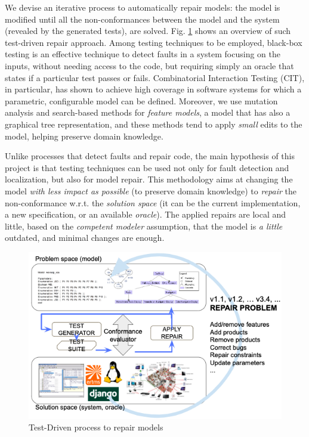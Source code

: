 \documentclass[
11pt, %
oneside, %
english, %
singlespacing, %
headsepline, %
]{MastersDoctoralThesis} %
\theoremstyle{plain}
\theoremstyle{definition}
\theoremstyle{remark}
\theoremstyle{remark}
\theoremstyle{plain}
\theoremstyle{plain}
\begin{document}
We devise an iterative process to automatically repair models: the model is modified until all the non-conformances between the model and the system (revealed by the generated tests), are solved. Fig. \ref{fig:approach} shows an overview of such test-driven repair approach. 
Among testing techniques to be employed, black-box testing is an effective technique to detect faults in a system focusing on the inputs, without needing access to the code, but requiring simply an oracle that states if a particular test %
passes or fails. 
Combinatorial Interaction Testing (CIT), in particular, has shown to achieve high coverage in software systems for which a parametric, configurable model can be defined. Moreover, we use mutation analysis and search-based methods for \textit{feature models}, a model that has also a graphical tree representation, and these methods tend to apply \textit{small} edits to the model, helping preserve domain knowledge.

Unlike processes that detect faults and repair code, %
the main hypothesis of this project is that testing techniques can be used not only for fault detection and localization, but also for model repair.
This methodology aims at changing the model \textit{with less impact as possible} (to preserve domain knowledge) to \textit{repair} the non-conformance w.r.t. the \textit{solution space} (it can be the current implementation, a new specification, or an available \textit{oracle}).
The applied repairs are local and little, based on the \textit{competent modeler} assumption, that the model is \textit{a little} outdated, and minimal changes are enough. 

\begin{figure}[!tb]
	\centering
	\includegraphics[width=.8\columnwidth]{images/repair.png}
	\caption{Test-Driven process to repair models}
	\label{fig:approach}
\end{figure}
\end{document}
